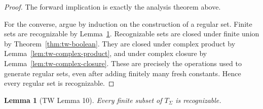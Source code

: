 \documentclass[11pt]{article}
\newtheorem{lemma}[theorem]{Lemma}
\theoremstyle{definition}
\newcommand{\SigmaSym}{\Sigma}
\newcommand{\Term}[1]{T_{#1}}
\begin{document}
\begin{proof}
The forward implication is exactly the analysis theorem above.

For the converse, argue by induction on the construction of a regular set.
Finite sets are recognizable by Lemma~\ref{lem:tw-finite-recognizable}.
Recognizable sets are closed under finite union by Theorem~\ref{thm:tw-boolean}.
They are closed under complex product by
Lemma~\ref{lem:tw-complex-product}, and under complex closure by
Lemma~\ref{lem:tw-complex-closure}.  These are precisely the operations used to
generate regular sets, even after adding finitely many fresh constants.  Hence
every regular set is recognizable.
\end{proof}

\begin{lemma}[TW Lemma 10]\label{lem:tw-finite-recognizable}
Every finite subset of \(\Term{\SigmaSym}\) is recognizable.
\end{lemma}
\end{document}
